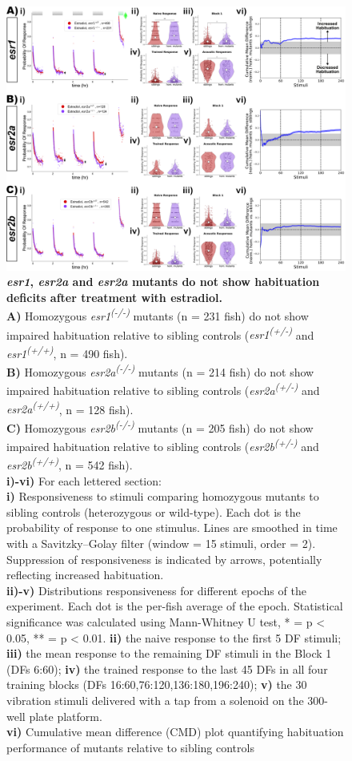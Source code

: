 \documentclass[9.5pt,lineno]{RandlettLab_elife}
\begin{document}
{\begin{figure}
\begin{fullwidth}
\begin{center}
\includegraphics[width=0.70\linewidth]{figures/NuclearSingleMutants.png}
\caption{\textbf{\emph{esr1}, \emph{esr2a} and \emph{esr2a} mutants do not show habituation deficits after treatment with estradiol.} \scriptsize
\\ \textbf{A)} Homozygous \emph{esr1\textsuperscript{(-/-)}} mutants (n = 231 fish) do not show impaired habituation relative to sibling controls (\emph{esr1\textsuperscript{(+/-)}} and \emph{esr1\textsuperscript{(+/+)}}, n = 490 fish). 
\\ \textbf{B)} Homozygous \emph{esr2a\textsuperscript{(-/-)}} mutants (n = 214 fish) do not show impaired habituation relative to sibling controls (\emph{esr2a\textsuperscript{(+/-)}} and \emph{esr2a\textsuperscript{(+/+)}}, n = 128 fish).
\\ \textbf{C)} Homozygous \emph{esr2b\textsuperscript{(-/-)}} mutants (n = 205 fish) do not show impaired habituation relative to sibling controls (\emph{esr2b\textsuperscript{(+/-)}} and \emph{esr2b\textsuperscript{(+/+)}}, n = 542 fish). 
\\ \textbf{i)-vi)} For each lettered section: 
\\ \textbf{i)} Responsiveness to stimuli comparing homozygous mutants to sibling controls (heterozygous or wild-type). 
Each dot is the probability of response to one stimulus. Lines are smoothed in time with a Savitzky–Golay filter (window = 15 stimuli, order = 2). 
Suppression of responsiveness is indicated by arrows, potentially reflecting increased habituation.
\\ \textbf{ii)-v)} Distributions responsiveness for different epochs of the experiment. Each dot is the per-fish average of the epoch. 
Statistical significance was calculated using Mann-Whitney U test, * = p < 0.05, ** = p < 0.01.
\textbf{ii)} the naive response to the first 5 DF stimuli; \textbf{iii)} the mean response to the remaining DF stimuli in the Block 1 (DFs 6:60); \textbf{iv)} the trained response to the last 45 DFs in all four training blocks (DFs 16:60,76:120,136:180,196:240); \textbf{v)} the 30 vibration stimuli delivered with a tap from a solenoid on the 300-well plate platform.
\\ \textbf{vi)} Cumulative mean difference (CMD) plot quantifying habituation performance of mutants relative to sibling controls
}


\end{center}
\end{fullwidth}
\end{figure}}
\end{document}
